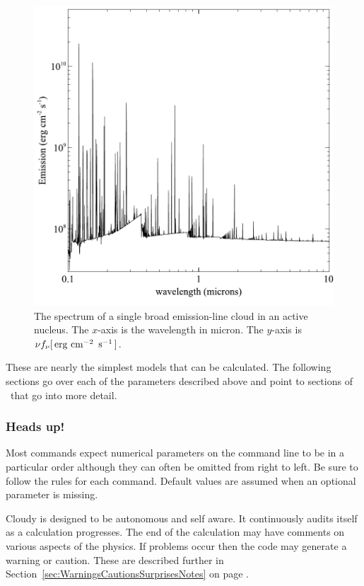 \documentclass[12pt,twoside]{article}
\begin{document}
{\begin{figure}
\begin{center}
\includegraphics[clip=on,width=0.8\columnwidth,height=0.8\textheight,keepaspectratio]{BLR_spectrum}
\end{center}
\caption{The spectrum of a single broad emission-line
cloud in an active nucleus.
The $x$-axis is the wavelength in micron.
The $y$-axis is $\nu f_\nu [{\rm\thinspace erg}\, \mbox{${\rm\thinspace cm}^{-2}\,$}\, \mbox{${\rm\thinspace s}^{-1}\,$}]$.}
\label{fig:BLR_spectrum}
\end{figure}

These are nearly the simplest models that can be calculated.  The
following sections go over each of the parameters described above and point
to sections of \Hazy\ that go into more detail.

\subsubsection{Heads up!}

Most commands expect numerical parameters
on the command line to be in
a particular order although they can often be omitted from right to left.
Be sure to follow the rules for each command.  Default values are assumed
when an optional parameter is missing.

Cloudy is designed to be autonomous and self aware.  It continuously
audits itself as a calculation progresses.  The end of the calculation may
have comments on various aspects of the
physics.
If problems occur then
the code may generate a warning or caution.
These are described further in Section~\ref{sec:WarningsCautionsSurprisesNotes}
on page \pageref{sec:WarningsCautionsSurprisesNotes}.

}
\end{document}
